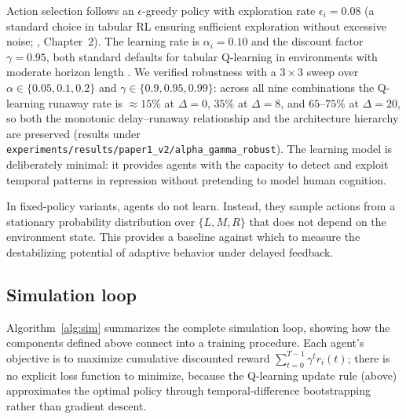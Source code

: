 Action selection follows an $\epsilon$-greedy policy with exploration rate $\epsilon_i = 0.08$ (a standard choice in tabular RL ensuring sufficient exploration without excessive noise; \citealp{sutton2018reinforcement}, Chapter~2). The learning rate is $\alpha_i = 0.10$ and the discount factor $\gamma = 0.95$, both standard defaults for tabular Q-learning in environments with moderate horizon length \citep{sutton2018reinforcement}. We verified robustness with a $3\times3$ sweep over $\alpha \in \{0.05, 0.1, 0.2\}$ and $\gamma \in \{0.9, 0.95, 0.99\}$: across all nine combinations the Q-learning runaway rate is ${\approx}15\%$ at $\Delta=0$, $35\%$ at $\Delta=8$, and $65$--$75\%$ at $\Delta=20$, so both the monotonic delay--runaway relationship and the architecture hierarchy are preserved (results under \texttt{experiments/results/paper1\_v2/alpha\_gamma\_robust}). The learning model is deliberately minimal: it provides agents with the capacity to detect and exploit temporal patterns in repression without pretending to model human cognition.

In fixed-policy variants, agents do not learn. Instead, they sample actions from a stationary probability distribution over $\{L,M,R\}$ that does not depend on the environment state. This provides a baseline against which to measure the destabilizing potential of adaptive behavior under delayed feedback.

\subsection{Simulation loop}

Algorithm~\ref{alg:sim} summarizes the complete simulation loop, showing how the components defined above connect into a training procedure. Each agent's objective is to maximize cumulative discounted reward $\sum_{t=0}^{T-1} \gamma^t r_i(t)$; there is no explicit loss function to minimize, because the Q-learning update rule (above) approximates the optimal policy through temporal-difference bootstrapping rather than gradient descent.

